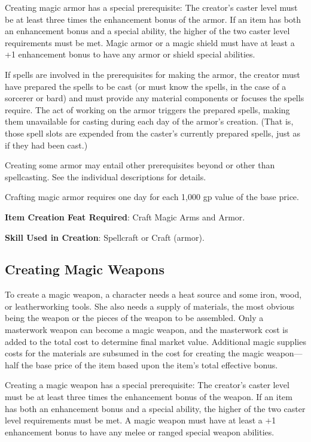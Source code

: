 Creating magic armor has a special prerequisite: The creator's caster level must be at least three times the enhancement bonus of the armor. If an item has both an enhancement bonus and a special ability, the higher of the two caster level requirements must be met. Magic armor or a magic shield must have at least a +1 enhancement bonus to have any armor or shield special abilities.
				
If spells are involved in the prerequisites for making the armor, the creator must have prepared the spells to be cast (or must know the spells, in the case of a sorcerer or bard) and must provide any material components or focuses the spells require. The act of working on the armor triggers the prepared spells, making them unavailable for casting during each day of the armor's creation. (That is, those spell slots are expended from the caster's currently prepared spells, just as if they had been cast.)
				
Creating some armor may entail other prerequisites beyond or other than spellcasting. See the individual descriptions for details.
				
Crafting magic armor requires one day for each 1,000 gp value of the base price.
				
\textbf{Item Creation Feat Required}: Craft Magic Arms and Armor.
				
\textbf{Skill Used in Creation}: Spellcraft or Craft (armor).
				
\subsection{Creating Magic Weapons}

				
To create a magic weapon, a character needs a heat source and some iron, wood, or leatherworking tools. She also needs a supply of materials, the most obvious being the weapon or the pieces of the weapon to be assembled. Only a masterwork weapon can become a magic weapon, and the masterwork cost is added to the total cost to determine final market value. Additional magic supplies costs for the materials are subsumed in the cost for creating the magic weapon---half the base price of the item based upon the item's total effective bonus.
				
Creating a magic weapon has a special prerequisite: The creator's caster level must be at least three times the enhancement bonus of the weapon. If an item has both an enhancement bonus and a special ability, the higher of the two caster level requirements must be met. A magic weapon must have at least a +1 enhancement bonus to have any melee or ranged special weapon abilities.
				
